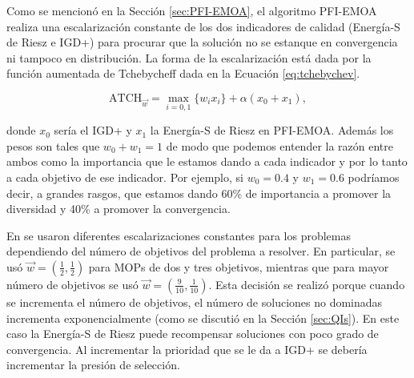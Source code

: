 Como se mencionó en la Sección \ref{sec:PFI-EMOA}, el algoritmo PFI-EMOA \cite{PFI} realiza una escalarización constante de los dos indicadores de calidad (Energía-S de Riesz e IGD+) para procurar que la solución no se estanque en convergencia ni tampoco en distribución. La forma de la escalarización está dada por la función aumentada de Tchebycheff dada en la Ecuación \ref{eq:tchebychev}.

\begin{equation} \label{eq:ATCH2}
    \text{ATCH}_{\vec{w}}=\max_{i=0,1} \{w_ix_i\}+\alpha (x_0+x_1),  
\end{equation}

donde $x_0$ sería el IGD+ y $x_1$ la Energía-S de Riesz en PFI-EMOA. Además los pesos son tales que $ w_0+w_1=1$ de modo que podemos entender la razón entre ambos como la importancia que le estamos dando a cada indicador y por lo tanto a cada objetivo de ese indicador. Por ejemplo, si $w_0=0.4$ y $w_1=0.6$ podríamos decir, a grandes rasgos, que estamos dando 60\% de importancia a promover la diversidad y 40\% a promover la convergencia.   

En \cite{PFI} se usaron diferentes escalarizaciones constantes para los problemas dependiendo del número de objetivos del problema a resolver. En particular, se usó $\vec{w}=(\frac{1}{2},\frac{1}{2})$ para MOPs de dos y tres objetivos, mientras que para mayor número de objetivos se usó $\vec{w}=(\frac{9}{10},\frac{1}{10})$. Esta decisión se realizó porque cuando se incrementa el número de objetivos, el número de soluciones no dominadas incrementa exponencialmente (como se discutió en la Sección \ref{sec:QIs}). En este caso la Energía-S de Riesz puede recompensar soluciones con poco grado de convergencia. Al incrementar la prioridad que se le da a IGD+ se debería incrementar la presión de selección. 

